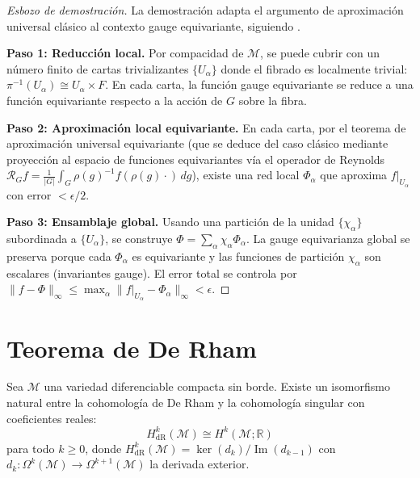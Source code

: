 \begin{proof}[Esbozo de demostración]
La demostración adapta el argumento de aproximación universal clásico al contexto gauge equivariante, siguiendo \citep{cohen2019gaugeequivariantconvolutional}.

\textbf{Paso 1: Reducción local.} Por compacidad de $\mathcal{M}$, se puede cubrir con un número finito de cartas trivializantes $\{U_\alpha\}$ donde el fibrado es localmente trivial: $\pi^{-1}(U_\alpha) \cong U_\alpha \times F$. En cada carta, la función gauge equivariante se reduce a una función equivariante respecto a la acción de $G$ sobre la fibra.

\textbf{Paso 2: Aproximación local equivariante.} En cada carta, por el teorema de aproximación universal equivariante (que se deduce del caso clásico mediante proyección al espacio de funciones equivariantes vía el operador de Reynolds $\mathcal{R}_G f = \frac{1}{|G|}\int_G \rho(g)^{-1} f(\rho(g) \cdot) \, dg$), existe una red local $\Phi_\alpha$ que aproxima $f|_{U_\alpha}$ con error $< \epsilon/2$.

\textbf{Paso 3: Ensamblaje global.} Usando una partición de la unidad $\{\chi_\alpha\}$ subordinada a $\{U_\alpha\}$, se construye $\Phi = \sum_\alpha \chi_\alpha \Phi_\alpha$. La gauge equivarianza global se preserva porque cada $\Phi_\alpha$ es equivariante y las funciones de partición $\chi_\alpha$ son escalares (invariantes gauge). El error total se controla por $\|f - \Phi\|_\infty \leq \max_\alpha \|f|_{U_\alpha} - \Phi_\alpha\|_\infty < \epsilon$.
\end{proof}

\section{Teorema de De Rham}\label{sec:de_rham}

\begin{theorem}[De Rham]\label{thm:de_rham_apendice}
Sea $\mathcal{M}$ una variedad diferenciable compacta sin borde. Existe un isomorfismo natural entre la cohomología de De Rham y la cohomología singular con coeficientes reales:
\[
H^k_{\text{dR}}(\mathcal{M}) \cong H^k(\mathcal{M}; \mathbb{R})
\]
para todo $k \geq 0$, donde $H^k_{\text{dR}}(\mathcal{M}) = \ker(d_k)/\operatorname{Im}(d_{k-1})$ con $d_k: \Omega^k(\mathcal{M}) \to \Omega^{k+1}(\mathcal{M})$ la derivada exterior.
\end{theorem}

